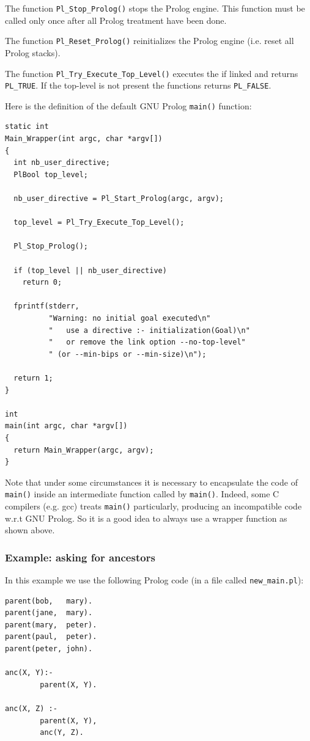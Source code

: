 The function \texttt{Pl\_Stop\_Prolog()} stops the Prolog engine. This function
must be called only once after all Prolog treatment have been done.

The function \texttt{Pl\_Reset\_Prolog()} reinitializes the Prolog engine
(i.e. reset all Prolog stacks).

The function \texttt{Pl\_Try\_Execute\_Top\_Level()} executes the
 if linked  and returns
\texttt{PL\_TRUE}. If the top-level is not present the functions returns
\texttt{PL\_FALSE}.

Here is the definition of the default GNU Prolog \texttt{main()} function:

\begin{Code}
\begin{verbatim}
static int
Main_Wrapper(int argc, char *argv[])
{
  int nb_user_directive;
  PlBool top_level;

  nb_user_directive = Pl_Start_Prolog(argc, argv);

  top_level = Pl_Try_Execute_Top_Level();

  Pl_Stop_Prolog();

  if (top_level || nb_user_directive)
    return 0;

  fprintf(stderr,
          "Warning: no initial goal executed\n"
          "   use a directive :- initialization(Goal)\n"
          "   or remove the link option --no-top-level"
          " (or --min-bips or --min-size)\n");

  return 1;
}

int
main(int argc, char *argv[])
{
  return Main_Wrapper(argc, argv);
}
\end{verbatim}
\end{Code}

Note that under some circumstances it is necessary to encapsulate the code of
\texttt{main()} inside an intermediate function called by
\texttt{main()}. Indeed, some C compilers (e.g. gcc) treats \texttt{main()}
particularly, producing an incompatible code w.r.t GNU Prolog. So it is a
good idea to always use a wrapper function as shown above.

\subsubsection{Example: asking for ancestors}

In this example we use the following Prolog code (in a file called
\texttt{new\_main.pl}):

\begin{Code}
\begin{verbatim}
parent(bob,   mary).
parent(jane,  mary).
parent(mary,  peter).
parent(paul,  peter).
parent(peter, john).

anc(X, Y):-
        parent(X, Y).

anc(X, Z) :-
        parent(X, Y),
        anc(Y, Z).
\end{verbatim}
\end{Code}

